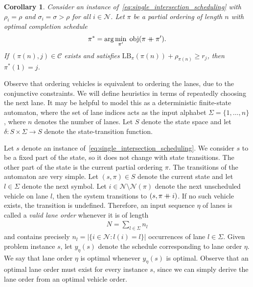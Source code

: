 \documentclass[a4paper]{article}
\newcommand\mdoubleplus{\mathbin{+\mkern-10mu+}}
\theoremstyle{definition}
\theoremstyle{plain}
\newtheorem{corollary}{Corollary}
\begin{document}
\begin{corollary}\label{prop:exhaustive_partial}
  Consider an instance of~\eqref{eq:single_intersection_scheduling} with
  $\rho_{i} = \rho$ and $\sigma_{i} = \sigma > \rho$ for all
  $i \in \mathcal{N}$.
  Let $\pi$ be a partial ordering of length $n$ with optimal completion schedule
  \begin{align*}
    \pi^{*} = \arg\min_{\pi'} \;  \mathrm{obj}(\pi \mdoubleplus \pi') .
  \end{align*}
  If $(\pi(n),j) \in \mathcal{C}$ exists and satisfies
  $\text{LB}_{{\pi}}(\pi(n)) + \rho_{\pi(n)} \geq r_{j}$, then $\pi^{*}(1) = j$.
\end{corollary}

Observe that ordering vehicles is equivalent to ordering the lanes, due to the
conjunctive constraints. We will define heuristics in terms of repeatedly
choosing the next lane. It may be helpful to model this as a deterministic
finite-state automaton, where the set of lane indices acts as the input alphabet
$\Sigma = \{ 1, \dots, n \}$, where $n$ denotes the number of lanes. Let $S$
denote the state space and let $\delta: S \times \Sigma \rightarrow S$ denote
the state-transition function.

Let $s$ denote an instance of~\eqref{eq:single_intersection_scheduling}. We
consider $s$ to be a fixed part of the state, so it does not change with state
transitions.
The other part of the state is the current partial ordering $\pi$.
The transitions of the automaton are very simple. Let $(s, \pi) \in S$ denote
the current state and let $l \in \Sigma$ denote the next symbol. Let
$i \in \mathcal{N} \setminus \mathcal{N}(\pi)$ denote the next unscheduled vehicle on lane $l$,
then the system transitions to $(s, \pi \mdoubleplus i)$. If no such vehicle exists, the
transition is undefined.
%
%
Therefore, an input sequence $\eta$ of lanes is called a \textit{valid lane
  order} whenever it is of length
\begin{align*}
  N = \sum_{l \in \Sigma} n_{l}
\end{align*}
and contains precisely $n_l = |\{ i \in \mathcal{N} : l(i) = l \}|$ occurrences
of lane $l \in \Sigma$. Given problem instance $s$, let $y_{\eta}(s)$ denote the
schedule corresponding to lane order $\eta$. We say that lane order $\eta$ is
optimal whenever $y_{\eta}(s)$ is optimal. Observe that an optimal lane order
must exist for every instance $s$, since we can simply derive the lane order
from an optimal vehicle order.
\end{document}
